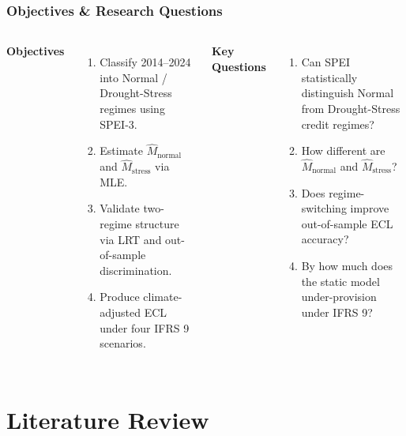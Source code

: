 \documentclass{beamer}
\begin{document}
\begin{frame}
    \frametitle{Objectives \& Research Questions}
    \begin{columns}[T]
    \textbf{Objectives}
    \begin{enumerate}\small
        \item Classify 2014--2024 into Normal / Drought-Stress regimes using SPEI-3.
        \item Estimate $\hat{M}_{\text{normal}}$ and $\hat{M}_{\text{stress}}$ via MLE.
        \item Validate two-regime structure via LRT and out-of-sample discrimination.
        \item Produce climate-adjusted ECL under four IFRS 9 scenarios.
    \end{enumerate}
    \textbf{Key Questions}
    \begin{enumerate}\small
        \item Can SPEI statistically distinguish Normal from Drought-Stress credit regimes?
        \item How different are $\hat{M}_{\text{normal}}$ and $\hat{M}_{\text{stress}}$?
        \item Does regime-switching improve out-of-sample ECL accuracy?
        \item By how much does the static model under-provision under IFRS 9?
    \end{enumerate}
    \end{columns}
\end{frame}

\section{Literature Review}
\end{document}

